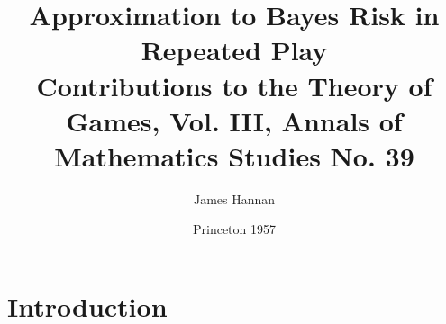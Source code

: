 \documentclass[11pt]{article}
\title{
    \huge Approximation to Bayes Risk in Repeated Play\\
    \vspace{10pt}
    \Large Contributions to the Theory of Games, Vol. III, Annals of Mathematics Studies No. 39
}
\author{James Hannan}
\date{Princeton 1957}
\theoremstyle{boldStyle}
\begin{document}
\maketitle





\section{Introduction}
\end{document}
